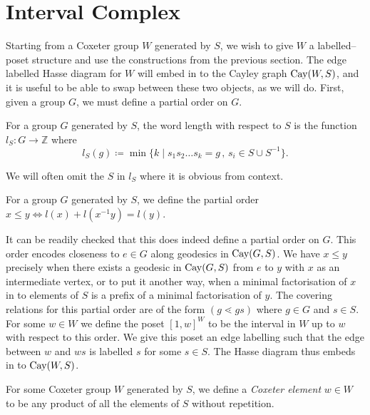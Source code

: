 \documentclass[class=article, crop=false]{standalone}
\begin{document}
\section{Interval Complex}
\label{sec:interval_cx}
Starting from a Coxeter group $W$ generated by $S$, we wish to give $W$ a labelled--poset structure and use the constructions from the previous section. The edge labelled Hasse diagram for $W$ will embed in to the Cayley graph $\text{Cay}(W,S)$, and it is useful to be able to swap between these two objects, as we will do. First, given a group $G$, we must define a partial order on $G$.

\begin{definition}
    For a group $G$ generated by $S$, the word length with respect to $S$ is the function $l_S:G\to \mathbb{Z}$ where
    \begin{equation*}
        l_S(g) \coloneq \min\{k \mid s_1s_2\ldots s_k=g \,,\, s_i \in S \cup S^{-1}\}.
    \end{equation*}
\end{definition}
We will often omit the $S$ in $l_S$ where it is obvious from context.

\begin{definition}
    For a group $G$ generated by $S$, we define the partial order $x \leq y \iff l(x) + l(x^{-1}y) = l(y)$.
\end{definition}

It can be readily checked that this does indeed define a partial 
order on $G$. This order encodes closeness to $e \in G$ along geodesics in $\text{Cay}(G,S)$. We have $x \leq y$ precisely when there exists a geodesic in $\text{Cay}(G, S)$ from $e$ to $y$ with $x$ as an intermediate vertex, or to put it another way, when a minimal factorisation of $x$ in to elements of $S$ is a prefix of a minimal factorisation of $y$. The covering relations for this partial order are of the form $(g \lessdot gs)$ where $g \in G$ and $s \in S$.
For some $w \in W$ we define the poset $[1,w]^W$ to be the interval in $W$ up to $w$ with respect to this order. We give this poset an edge labelling such that the edge between $w$ and $ws$ is labelled $s$ for some $s \in S$. The Hasse diagram thus embeds in to $\text{Cay}(W,S)$.

\begin{definition}
	For some Coxeter group $W$ generated by $S$, we define a \emph{Coxeter element} $w\in W$ to be any product of all the elements of $S$ without repetition.
\end{definition}
\end{document}

